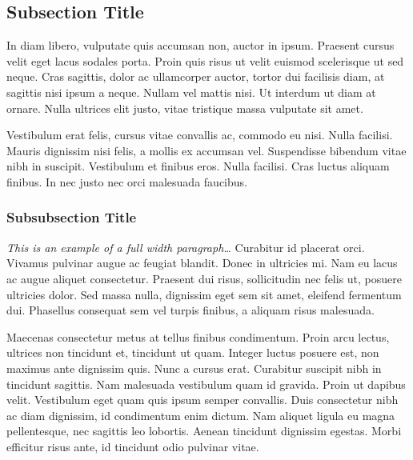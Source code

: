 \documentclass[
	a4paper, %
	12pt, %
]{CSSullivanBusinessReport}
\begin{document}
\subsection{Subsection Title} %

In diam libero, vulputate quis accumsan non, auctor in ipsum. Praesent cursus velit eget lacus sodales porta. Proin quis risus ut velit euismod scelerisque ut sed neque. Cras sagittis, dolor ac ullamcorper auctor, tortor dui facilisis diam, at sagittis nisi ipsum a neque. Nullam vel mattis nisi. Ut interdum ut diam at ornare. Nulla ultrices elit justo, vitae tristique massa vulputate sit amet.

Vestibulum erat felis, cursus vitae convallis ac, commodo eu nisi. Nulla facilisi. Mauris dignissim nisi felis, a mollis ex accumsan vel. Suspendisse bibendum vitae nibh in suscipit. Vestibulum et finibus eros. Nulla facilisi. Cras luctus aliquam finibus. In nec justo nec orci malesuada faucibus.

\subsubsection{Subsubsection Title} %

\begin{fullwidth} %
	\textit{This is an example of a full width paragraph\ldots} Curabitur id placerat orci. Vivamus pulvinar augue ac feugiat blandit. Donec in ultricies mi. Nam eu lacus ac augue aliquet consectetur. Praesent dui risus, sollicitudin nec felis ut, posuere ultricies dolor. Sed massa nulla, dignissim eget sem sit amet, eleifend fermentum dui. Phasellus consequat sem vel turpis finibus, a aliquam risus malesuada.
\end{fullwidth}

Maecenas consectetur metus at tellus finibus condimentum. Proin arcu lectus, ultrices non tincidunt et, tincidunt ut quam. Integer luctus posuere est, non maximus ante dignissim quis. Nunc a cursus erat. Curabitur suscipit nibh in tincidunt sagittis. Nam malesuada vestibulum quam id gravida. Proin ut dapibus velit. Vestibulum eget quam quis ipsum semper convallis. Duis consectetur nibh ac diam dignissim, id condimentum enim dictum. Nam aliquet ligula eu magna pellentesque, nec sagittis leo lobortis. Aenean tincidunt dignissim egestas. Morbi efficitur risus ante, id tincidunt odio pulvinar vitae.
\end{document}
